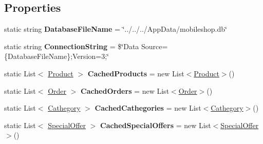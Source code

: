\subsection*{Properties}
\begin{DoxyCompactItemize}
\item 
\mbox{\label{class_eshop_1_1_database_ac9d0477f1f5107a155f7d59f2fdcd9e8}} 
static string {\bfseries Database\+File\+Name} = \char`\"{}../../../App\+Data/mobileshop.\+db\char`\"{}
\item 
\mbox{\label{class_eshop_1_1_database_a98a7f9cf7e8df4e96ae82e26ae3f5c6a}} 
static string {\bfseries Connection\+String} = \$\char`\"{}Data Source=\{Database\+File\+Name\};Version=3;\char`\"{}
\item 
\mbox{\label{class_eshop_1_1_database_ac8f5160ffc13bdc056b4bdfd46e2019a}} 
static List$<$ \mbox{\hyperlink{class_eshop_1_1_product}{Product}} $>$ {\bfseries Cached\+Products} = new List$<$\mbox{\hyperlink{class_eshop_1_1_product}{Product}}$>$()
\item 
\mbox{\label{class_eshop_1_1_database_a2f403386c6481ed9717199b824c77eb3}} 
static List$<$ \mbox{\hyperlink{class_eshop_1_1_order}{Order}} $>$ {\bfseries Cached\+Orders} = new List$<$\mbox{\hyperlink{class_eshop_1_1_order}{Order}}$>$()
\item 
\mbox{\label{class_eshop_1_1_database_a91e87e815906f7c8f022377ba0a3d1f2}} 
static List$<$ \mbox{\hyperlink{class_eshop_1_1_cathegory}{Cathegory}} $>$ {\bfseries Cached\+Cathegories} = new List$<$\mbox{\hyperlink{class_eshop_1_1_cathegory}{Cathegory}}$>$()
\item 
\mbox{\label{class_eshop_1_1_database_a19ff043293ba2b24a9af08939ab467b6}} 
static List$<$ \mbox{\hyperlink{class_eshop_1_1_database_entites_1_1_special_offer}{Special\+Offer}} $>$ {\bfseries Cached\+Special\+Offers} = new List$<$\mbox{\hyperlink{class_eshop_1_1_database_entites_1_1_special_offer}{Special\+Offer}}$>$()

\end{DoxyCompactItemize}
